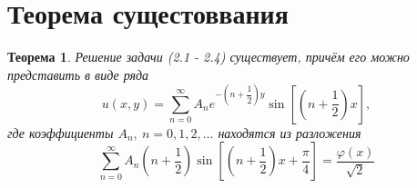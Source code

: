 \documentclass[a4paper, 12pt]{article}
\newtheorem{theorem}{Теорема}
\numberwithin{equation}{section}
\numberwithin{lemma}{section}
\numberwithin{definition}{section}
\numberwithin{notabene}{section}
\numberwithin{corollary}{section}
\begin{document}
\section{Теорема сущестоввания}
\begin{theorem}
	Решение задачи (2.1 - 2.4) существует, причём его можно представить в виде ряда
	\begin{equation}
		u(x,y) = \sum\limits_{n=0}^{\infty} A_n e^{-\left(n + \dfrac12\right)y} \sin{\left[\left(n + \dfrac12\right)x\right]},
	\end{equation}
	где коэффициенты $A_n, \ n =0,1,2, \dots$ находятся из разложения
	\begin{equation}
		\sum\limits_{n=0}^{\infty} A_n \left(n + \dfrac12 \right) \sin{\left[\left(n +\dfrac12\right)x + \dfrac\pi4\right]} = \dfrac{\varphi(x)}{\sqrt2}
	\end{equation}
\end{theorem}
\end{document}
